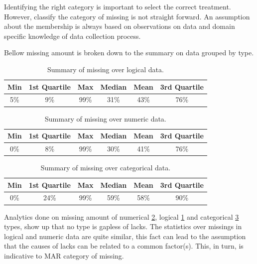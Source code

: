 Identifying the right category is important to select the correct treatment. However, classify the category of missing is not straight forward. An assumption about the membership is always based on observations on data and domain specific knowledge of data collection process.

Bellow missing amount is broken down to the summary on data grouped by type.

 \begin{table}[h!]
  \begin{center}
    \caption{Summary of missing over logical data.}
    \label{tab:missings-over-logical}
    \begin{tabular}{c|c|c|c|c|c}
    Min & 1st Quartile & Max & Median & Mean & 3rd Quartile \\
      \hline
     5\% & 9\% & 99\% & 31\% & 43\% & 76\% \\ 
     \hline 
    \end{tabular}
  \end{center}
\end{table}
 
 \begin{table}[h!]
  \begin{center}
    \caption{Summary of missing over numeric data.}
    \label{tab:missings-over-numeric}
    \begin{tabular}{c|c|c|c|c|c}
    Min & 1st Quartile & Max & Median & Mean & 3rd Quartile \\
      \hline
     0\% & 8\% & 99\% & 30\% & 41\% & 76\% \\ 
     \hline 
    \end{tabular}
  \end{center}
\end{table}
   

 \begin{table}[h!]
  \begin{center}
    \caption{Summary of missing over categorical data.}
    \label{tab:missings-over-categorical}
    \begin{tabular}{c|c|c|c|c|c}
    Min & 1st Quartile & Max & Median & Mean & 3rd Quartile \\
      \hline
     0\% & 24\% & 99\% & 59\% & 58\% & 90\% \\ 
     \hline 
    \end{tabular}
  \end{center}
\end{table}


Analytics done on missing amount of numerical \ref{tab:missings-over-numeric}, logical \ref{tab:missings-over-logical} and categorical \ref{tab:missings-over-categorical} types, show up that no type is gapless of lacks. The statistics over missings in logical and numeric data are quite similar, this fact can lead to the assumption that the causes of lacks can be related to a common factor(s). This, in turn, is indicative to MAR category of missing.

